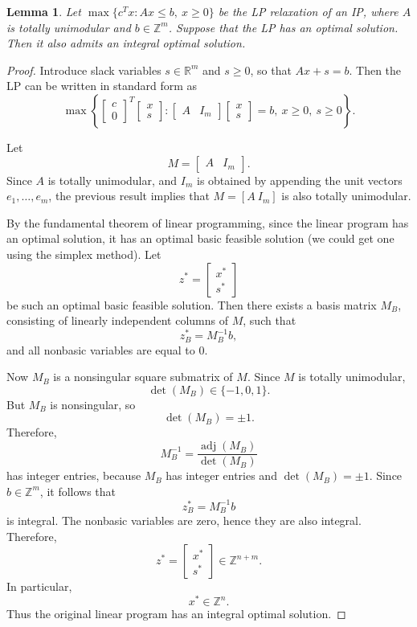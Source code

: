 \documentclass[12pt]{report}
\newtheorem{llemma}[base]{Lemma}
\numberwithin{algorithm}{chapter}
\begin{document}
	\begin{llemma}
		Let
		$\max \{c^T x : Ax \leq b,\ x \geq 0\}$
		be the LP relaxation of an IP, where $A$ is totally unimodular and $b\in\mathbb Z^m$. Suppose that the LP has an optimal solution. Then it also admits an integral optimal solution.
	\end{llemma}
	\begin{proof}
		Introduce slack variables $s\in \mathbb{R}^m$ and $s \geq 0$, so that $Ax+s=b.$
		Then the LP can be written in standard form as
		\[
		\max \left\{
		\begin{bmatrix}
			c \\
			0
		\end{bmatrix}^T
		\begin{bmatrix}
			x \\
			s
		\end{bmatrix}
		:
		\begin{bmatrix}
			A & I_m
		\end{bmatrix}
		\begin{bmatrix}
			x \\
			s
		\end{bmatrix}
		=b,\ x\geq 0,\ s\geq 0
		\right\}.
		\]
		
		Let
		\[
		M=\begin{bmatrix} A & I_m \end{bmatrix}.
		\]
		Since $A$ is totally unimodular, and $I_m$ is obtained by appending the unit vectors $e_1,\dots,e_m$, the previous result implies that $M=[A\ I_m]$ is also totally unimodular.
		
		By the fundamental theorem of linear programming, since the linear program has an optimal solution, it has an optimal basic feasible solution (we could get one using the simplex method). Let
		\[
		z^*=
		\begin{bmatrix}
			x^* \\
			s^*
		\end{bmatrix}
		\]
		be such an optimal basic feasible solution. Then there exists a basis matrix $M_B$, consisting of linearly independent columns of $M$, such that
		\[
		z_B^* = M_B^{-1}b,
		\]
		and all nonbasic variables are equal to $0$.
		
		Now $M_B$ is a nonsingular square submatrix of $M$. Since $M$ is totally unimodular,
		\[
		\det(M_B)\in \{-1,0,1\}.
		\]
		But \(M_B\) is nonsingular, so
		\[
		\det(M_B)=\pm 1.
		\]
		Therefore,
		\[
		M_B^{-1}=\frac{\operatorname{adj}(M_B)}{\det(M_B)}
		\]
		has integer entries, because \(M_B\) has integer entries and \(\det(M_B)=\pm 1\). Since \(b\in \mathbb{Z}^m\), it follows that
		\[
		z_B^*=M_B^{-1}b
		\]
		is integral. The nonbasic variables are zero, hence they are also integral. Therefore,
		\[
		z^*=
		\begin{bmatrix}
			x^* \\
			s^*
		\end{bmatrix}
		\in \mathbb{Z}^{n+m}.
		\]
		In particular,
		\[
		x^*\in \mathbb{Z}^n.
		\]
		Thus the original linear program has an integral optimal solution.
	\end{proof}
	
\end{document}
